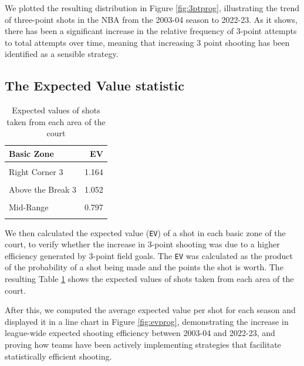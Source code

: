 \documentclass[
  12pt,
  a4paper,
]{article}
\begin{document}
We plotted the resulting distribution in Figure \ref{fig:3ptprog}, illustrating the trend of three-point shots in the NBA from the 2003-04 season to 2022-23. As it shows, there has been a significant increase in the relative frequency of 3-point attempts to total attempts over time, meaning that increasing 3 point shooting has been identified as a sensible strategy.

\hypertarget{the-expected-value-statistic}{%
\subsection{The Expected Value statistic}\label{the-expected-value-statistic}}

\begin{table}

\caption{\label{tab:evinfo}Expected values of shots
                 taken from each area of the court}
\centering
\begin{tabular}[t]{lr}
\toprule
Basic Zone & EV\\
\midrule
\cellcolor{gray!30}{Restricted Area} & \cellcolor{gray!30}{1.227}\\
Right Corner 3 & 1.164\\
\cellcolor{gray!30}{Left Corner 3} & \cellcolor{gray!30}{1.159}\\
Above the Break 3 & 1.052\\
\cellcolor{gray!30}{In The Paint (Non-RA)} & \cellcolor{gray!30}{0.813}\\
Mid-Range & 0.797\\
\cellcolor{gray!30}{Backcourt} & \cellcolor{gray!30}{0.075}\\
\bottomrule
\end{tabular}
\end{table}

We then calculated the expected value (\texttt{EV}) of a shot in each basic zone of the court, to verify whether the increase in 3-point shooting was due to a higher efficiency generated by 3-point field goals. The \texttt{EV} was calculated as the product of the probability of a shot being made and the points the shot is worth. The resulting Table \ref{tab:evinfo} shows the expected values of shots taken from each area of the court.

After this, we computed the average expected value per shot for each season and displayed it in a line chart in Figure \ref{fig:evprog}, demonstrating the increase in league-wide expected shooting efficiency between 2003-04 and 2022-23, and proving how teams have been actively implementing strategies that facilitate statistically efficient shooting.
\end{document}
